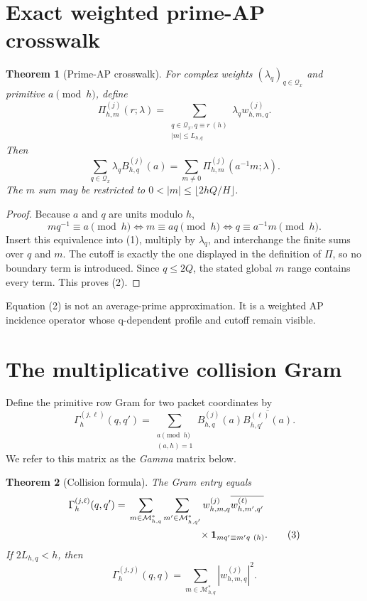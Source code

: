 \documentclass[11pt]{article}
\newtheorem{theorem}{Theorem}
\newcommand{\Qx}{\mathcal Q_x}
\newcommand{\M}{\mathcal M}
\begin{document}
\section{Exact weighted prime-AP crosswalk}

\begin{theorem}[Prime-AP crosswalk]
For complex weights $(\lambda_q)_{q\in\Qx}$ and primitive $a\pmod h$, define
\[
 \Pi_{h,m}^{(j)}(r;\lambda)=
 \sum_{\substack{q\in\Qx, q\equiv r\ (h)\\ |m|\leq L_{h,q}}}
 \lambda_q w_{h,m,q}^{(j)}.
\]
Then
\[
 \sum_{q\in\Qx}\lambda_q B_{h,q}^{(j)}(a)
 =\sum_{m\neq0}\Pi_{h,m}^{(j)}(a^{-1}m;\lambda). \tag{2}
\]
The $m$ sum may be restricted to $0<|m|\leq\lfloor 2hQ/H\rfloor$.
\end{theorem}

\begin{proof}
Because $a$ and $q$ are units modulo $h$,
\[
 m q^{-1}\equiv a\pmod h
 \Longleftrightarrow m\equiv aq\pmod h
 \Longleftrightarrow q\equiv a^{-1}m\pmod h.
\]
Insert this equivalence into (1), multiply by $\lambda_q$, and interchange the finite
sums over $q$ and $m$.  The cutoff is exactly the one displayed in the definition of
$\Pi$, so no boundary term is introduced.  Since $q\leq2Q$, the stated global $m$ range
contains every term.  This proves (2).\end{proof}

Equation (2) is not an average-prime approximation.  It is a weighted AP incidence
operator whose q-dependent profile and cutoff remain visible.

\section{The multiplicative collision Gram}

Define the primitive row Gram for two packet coordinates by
\[
 \Gamma_h^{(j,\ell)}(q,q')=
 \sum_{\substack{a\pmod h\\(a,h)=1}}
 B_{h,q}^{(j)}(a)\overline{B_{h,q'}^{(\ell)}(a)}.
\]
We refer to this matrix as the \emph{Gamma} matrix below.

\begin{theorem}[Collision formula]
The Gram entry equals
\begin{align*}
 \Gamma_h^{(j,\ell)}(q,q')
  ={}&\sum_{m\in\M_{h,q}^{*}}
       \sum_{m'\in\M_{h,q'}^{*}}
       w_{h,m,q}^{(j)}\overline{w_{h,m',q'}^{(\ell)}}\\
     &\hspace{25mm}\times
       \mathbf 1_{m q'\equiv m'q\ (h)}. \tag{3}
\end{align*}
If $2L_{h,q}<h$, then
\[
 \Gamma_h^{(j,j)}(q,q)=
 \sum_{m\in\M_{h,q}^{*}}|w_{h,m,q}^{(j)}|^2. \tag{4}
\]
\end{theorem}
\end{document}
